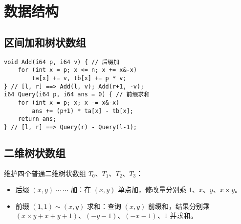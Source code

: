 \documentclass[a4paper,landscape,twocolumn]{ctexart}
\begin{document}
\section{数据结构}

\subsection{区间加和树状数组}

\begin{lstlisting}
void Add(i64 p, i64 v) { // 后缀加
	for (int x = p; x <= n; x += x&-x)
		ta[x] += v, tb[x] += p * v;
} // [l, r] ==> Add(l, v); Add(r+1, -v);
i64 Query(i64 p, i64 ans = 0) { // 前缀求和
	for (int x = p; x; x -= x&-x)
		ans += (p+1) * ta[x] - tb[x];
	return ans;
} // [l, r] ==> Query(r) - Query(l-1);
\end{lstlisting}

\subsection{二维树状数组}

维护四个普通二维树状数组 $T_0$、$T_1$、$T_2$、$T_3$：

\begin{itemize}
\item 后缀 $(x, y) \sim \cdots$ 加：在 $(x, y)$ 单点加，修改量分别乘 $1$、$x$、$y$、$x \times y$。
\item 前缀 $(1, 1) \sim (x, y)$ 求和：查询 $(x, y)$ 前缀和，结果分别乘 $(x \times y + x + y + 1)$、$(-y - 1)$、$(-x - 1)$、$1$ 并求和。
\end{itemize}

\end{document}
